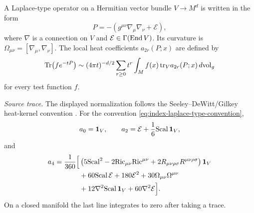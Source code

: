 \begin{definition}
\label{def:index-laplace-type-heat-coefficients}
A Laplace-type operator on a Hermitian vector bundle \(V\to M^d\) is written
in the form
\begin{equation}
  P=-(g^{\mu\nu}\nabla_\mu\nabla_\nu+\mathcal E),
  \label{eq:index-laplace-type-convention}
\end{equation}
where \(\nabla\) is a connection on \(V\) and
\(\mathcal E\in\Gamma({\rm End}\,V)\).  Its curvature is
\(\Omega_{\mu\nu}=[\nabla_\mu,\nabla_\nu]\).  The local heat coefficients
\(a_{2r}(P;x)\) are defined by
\begin{equation}
  {\rm Tr}\!\left(f e^{-tP}\right)
  \sim
  (4\pi t)^{-d/2}
  \sum_{r\geq0}t^r
  \int_M f(x)\,{\rm tr}_V a_{2r}(P;x)\,d{\rm vol}_g
  \label{eq:index-heat-coeff-definition}
\end{equation}
for every test function \(f\).
\end{definition}

\begin{quotedtheorem}
\label{qthm:index-seeley-dewitt-coefficients}
\emph{Source trace.}  The displayed normalization follows the
Seeley--DeWitt/Gilkey heat-kernel convention
\cite{Seeley1967,Gilkey1984}.
For the convention \eqref{eq:index-laplace-type-convention},
\begin{equation}
  a_0={\bf 1}_V,
  \qquad
  a_2=\mathcal E+\frac16{\rm Scal}\,{\bf 1}_V,
  \label{eq:index-a0-a2}
\end{equation}
and
\begin{equation}
\begin{aligned}
  a_4
  =
  \frac1{360}\Big[
  &\left(5{\rm Scal}^2-2{\rm Ric}_{\mu\nu}{\rm Ric}^{\mu\nu}
  +2R_{\mu\nu\rho\sigma}R^{\mu\nu\rho\sigma}\right){\bf 1}_V \\
  &+60{\rm Scal}\,\mathcal E
  +180\mathcal E^2
  +30\Omega_{\mu\nu}\Omega^{\mu\nu} \\
  &+12\nabla^2{\rm Scal}\,{\bf 1}_V
  +60\nabla^2\mathcal E
  \Big].
  \label{eq:index-a4-seeley-dewitt}
\end{aligned}
\end{equation}
On a closed manifold the last line integrates to zero after taking a trace.
\end{quotedtheorem}

